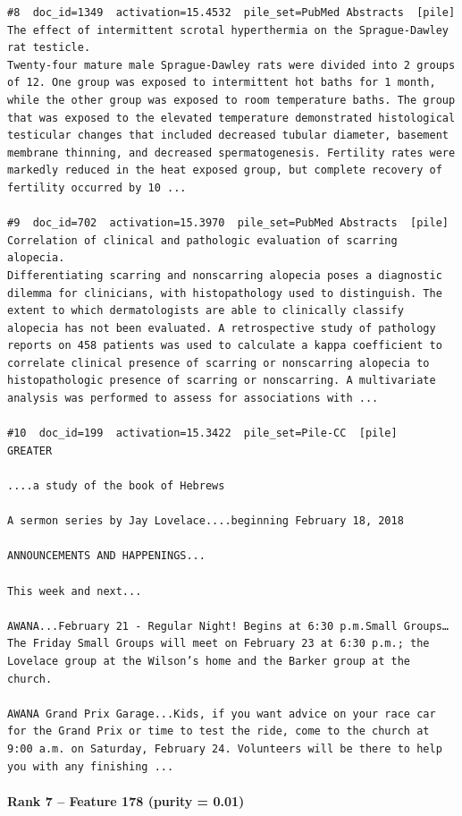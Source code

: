 \begin{verbatim}
#8  doc_id=1349  activation=15.4532  pile_set=PubMed Abstracts  [pile]
The effect of intermittent scrotal hyperthermia on the Sprague-Dawley rat testicle.
Twenty-four mature male Sprague-Dawley rats were divided into 2 groups of 12. One group was exposed to intermittent hot baths for 1 month, while the other group was exposed to room temperature baths. The group that was exposed to the elevated temperature demonstrated histological testicular changes that included decreased tubular diameter, basement membrane thinning, and decreased spermatogenesis. Fertility rates were markedly reduced in the heat exposed group, but complete recovery of fertility occurred by 10 ...

#9  doc_id=702  activation=15.3970  pile_set=PubMed Abstracts  [pile]
Correlation of clinical and pathologic evaluation of scarring alopecia.
Differentiating scarring and nonscarring alopecia poses a diagnostic dilemma for clinicians, with histopathology used to distinguish. The extent to which dermatologists are able to clinically classify alopecia has not been evaluated. A retrospective study of pathology reports on 458 patients was used to calculate a kappa coefficient to correlate clinical presence of scarring or nonscarring alopecia to histopathologic presence of scarring or nonscarring. A multivariate analysis was performed to assess for associations with ...

#10  doc_id=199  activation=15.3422  pile_set=Pile-CC  [pile]
GREATER

....a study of the book of Hebrews

A sermon series by Jay Lovelace....beginning February 18, 2018

ANNOUNCEMENTS AND HAPPENINGS...

This week and next...

AWANA...February 21 - Regular Night! Begins at 6:30 p.m.Small Groups…The Friday Small Groups will meet on February 23 at 6:30 p.m.; the Lovelace group at the Wilson’s home and the Barker group at the church.

AWANA Grand Prix Garage...Kids, if you want advice on your race car for the Grand Prix or time to test the ride, come to the church at 9:00 a.m. on Saturday, February 24. Volunteers will be there to help you with any finishing ...

\end{verbatim}

\paragraph*{Rank 7 -- Feature 178 (purity = 0.01)}

